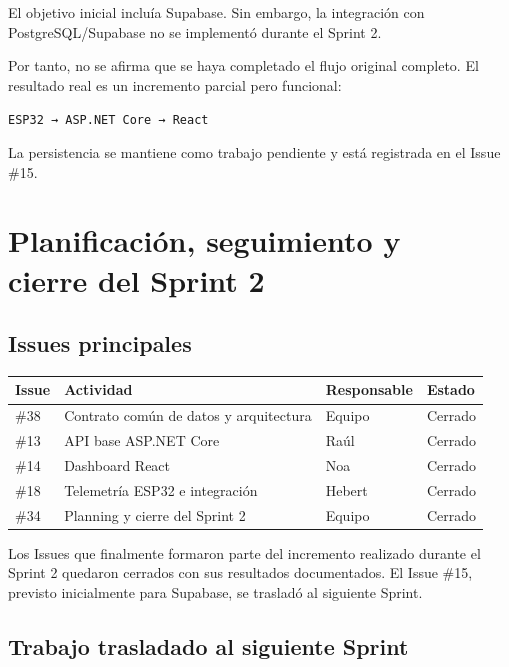 \documentclass[11pt,a4paper,oneside]{report}
\begin{document}
El objetivo inicial incluía Supabase. Sin embargo, la integración con PostgreSQL/Supabase no se implementó durante el Sprint 2.

Por tanto, no se afirma que se haya completado el flujo original completo. El resultado real es un incremento parcial pero funcional:

\begin{center}
\texttt{ESP32 → ASP.NET Core → React}
\end{center}

La persistencia se mantiene como trabajo pendiente y está registrada en el Issue \#15.


\chapter[Planificación, seguimiento y cierre del Sprint 2]{Planificación, seguimiento y\\cierre del Sprint 2}

\section{Issues principales}

\begin{longtable}{@{}p{1.4cm}p{6.3cm}p{2.2cm}p{1.6cm}@{}}
\toprule
\textbf{Issue} & \textbf{Actividad} & \textbf{Responsable} & \textbf{Estado} \\
\midrule
\endhead
\#38 & Contrato común de datos y arquitectura & Equipo & Cerrado \\
\#13 & API base ASP.NET Core & Raúl & Cerrado \\
\#14 & Dashboard React & Noa & Cerrado \\
\#18 & Telemetría ESP32 e integración & Hebert & Cerrado \\
\#34 & Planning y cierre del Sprint 2 & Equipo & Cerrado \\
\bottomrule
\end{longtable}

Los Issues que finalmente formaron parte del incremento realizado durante el Sprint 2 quedaron cerrados con sus resultados documentados. El Issue \#15, previsto inicialmente para Supabase, se trasladó al siguiente Sprint.

\section{Trabajo trasladado al siguiente Sprint}
\end{document}
